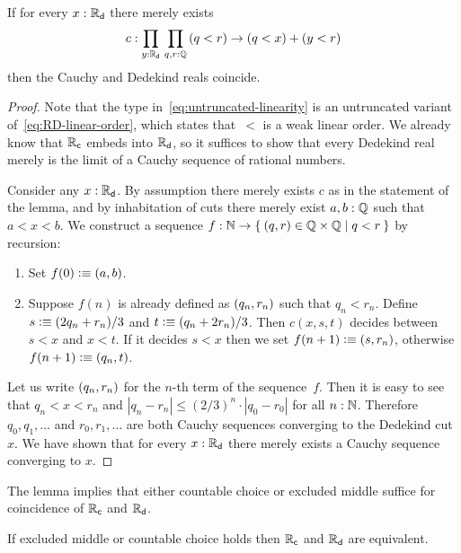 \begin{lem} \label{lem:untruncated-linearity-reals-coincide}
  If for every $x : \mathbb{R}_\mathsf{d}$ there merely exists
  \begin{equation}
    \label{eq:untruncated-linearity}
    c : \prd{y : \RD} \prd{q, r : \Q} (q < r) \to (q < x) + (y < r)
  \end{equation}
  then the Cauchy and Dedekind reals coincide.
\end{lem}

\begin{proof}
  Note that the type in~\eqref{eq:untruncated-linearity} is an untruncated variant
  of~\eqref{eq:RD-linear-order}, which states that~$<$ is a weak linear order.
  We already know that $\mathbb{R}_\mathsf{c}$ embeds into $\mathbb{R}_\mathsf{d}$, so it suffices to show that every Dedekind
  real merely is the limit of a Cauchy sequence of rational numbers.

  Consider any $x : \mathbb{R}_\mathsf{d}$. By assumption there merely exists $c$ as in the statement of the
  lemma, and by inhabitation of cuts there merely exist $a, b : \mathbb{Q}$ such that $a < x < b$.
  We construct a sequence $f : \N \to \setof{ \pairr{q, r} \in \Q \times \Q | q < r }$ by
  recursion:
  \begin{enumerate}
  \item Set $f(0) \vcentcolon\equiv {\mathopen{}(a, b)\mathclose{}}$.
  \item Suppose $f(n)$ is already defined as ${\mathopen{}(q_n, r_n)\mathclose{}}$ such that $q_n < r_n$.
    Define $s \vcentcolon\equiv (2 q_n + r_n)/3$ and $t \vcentcolon\equiv (q_n + 2 r_n)/3$. Then $c(x,s,t)$
    decides between $s < x$ and $x < t$. If it decides $s < x$ then we set $f(n+1) \vcentcolon\equiv
    {\mathopen{}(s, r_n)\mathclose{}}$, otherwise $f(n+1) \vcentcolon\equiv {\mathopen{}(q_n, t)\mathclose{}}$.
  \end{enumerate}
  Let us write ${\mathopen{}(q_n, r_n)\mathclose{}}$ for the $n$-th term of the sequence~$f$. Then it is easy
  to see that $q_n < x < r_n$ and $|q_n - r_n| \leq (2/3)^n \cdot |q_0 - r_0|$ for all $n
  : \mathbb{N}$. Therefore $q_0, q_1, \ldots$ and $r_0, r_1, \ldots$ are both Cauchy sequences
  converging to the Dedekind cut~$x$. We have shown that for every $x : \mathbb{R}_\mathsf{d}$ there merely
  exists a Cauchy sequence converging to $x$.
\end{proof}

The lemma implies that either countable choice or excluded middle suffice for coincidence
of $\mathbb{R}_\mathsf{c}$ and $\mathbb{R}_\mathsf{d}$.

\begin{cor} \label{when-reals-coincide}
  If excluded middle or countable choice holds then $\mathbb{R}_\mathsf{c}$ and $\mathbb{R}_\mathsf{d}$ are equivalent.
\end{cor}

